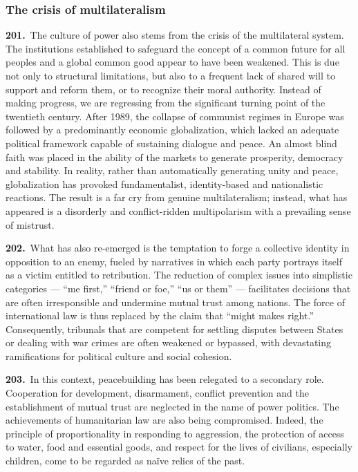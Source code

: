 \documentclass{article}
\begin{document}
\subsubsection{The crisis of multilateralism}

\textbf{201.}\ The culture of power also stems from the crisis of the multilateral system. The institutions established to safeguard the concept of a common future for all peoples and a global common good appear to have been weakened. This is due not only to structural limitations, but also to a frequent lack of shared will to support and reform them, or to recognize their moral authority. Instead of making progress, we are regressing from the significant turning point of the twentieth century. After 1989, the collapse of communist regimes in Europe was followed by a predominantly economic globalization, which lacked an adequate political framework capable of sustaining dialogue and peace. An almost blind faith was placed in the ability of the markets to generate prosperity, democracy and stability. In reality, rather than automatically generating unity and peace, globalization has provoked fundamentalist, identity-based and nationalistic reactions. The result is a far cry from genuine multilateralism; instead, what has appeared is a disorderly and conflict-ridden multipolarism with a prevailing sense of mistrust.

\textbf{202.}\ What has also re-emerged is the temptation to forge a collective identity in opposition to an enemy, fueled by narratives in which each party portrays itself as a victim entitled to retribution. The reduction of complex issues into simplistic categories --- ``me first,'' ``friend or foe,'' ``us or them'' --- facilitates decisions that are often irresponsible and undermine mutual trust among nations. The force of international law is thus replaced by the claim that ``might makes right.'' Consequently, tribunals that are competent for settling disputes between States or dealing with war crimes are often weakened or bypassed, with devastating ramifications for political culture and social cohesion.\cite{n185}

\textbf{203.}\ In this context, peacebuilding has been relegated to a secondary role. Cooperation for development, disarmament, conflict prevention and the establishment of mutual trust are neglected in the name of power politics. The achievements of humanitarian law are also being compromised. Indeed, the principle of proportionality in responding to aggression, the protection of access to water, food and essential goods, and respect for the lives of civilians, especially children, come to be regarded as naïve relics of the past.
\end{document}

